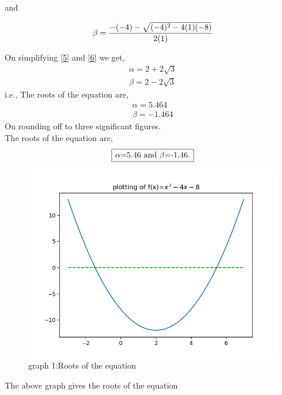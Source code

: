 \documentclass[journal,12pt,twocolumn]{IEEEtran}
\begin{document}
and

\begin{align} \label{6}
\beta =\Large \frac{-(-4)-\sqrt{(-4)^2-4(1)(-8)}}{2(1)}
\end{align}

On simplifying \eqref{5} and \eqref{6} we get,
\begin{align}
\alpha=2+2\sqrt{3}  \\ \beta=2-2\sqrt{3} 
\end{align}
i.e., The roots of the equation are,
\begin{align}
\alpha=5.464   \\ \beta=-1.464
\end{align}
On rounding off to three significant figures.
\\The roots of the equation are,
\begin{align} 
\framebox[1.1\width]{$\alpha$=5.46 and $\beta$=-1.46.}
\end{align}
\begin{figure}[h] 
\includegraphics[scale=0.65] 
{Figure_0}\large
\caption{graph 1:Roots of the equation}
\label{fig:a}
\end{figure}

\noindent The above graph \pageref{fig:a}   gives the roots of the equation 
\end{document}
